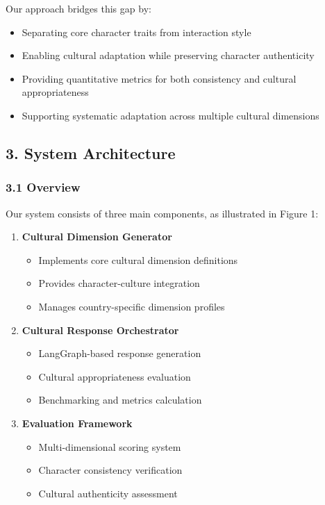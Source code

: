 \documentclass[
]{article}
\providecommand{\tightlist}{%
  \setlength{\itemsep}{0pt}\setlength{\parskip}{0pt}}
\begin{document}
Our approach bridges this gap by: 
\begin{itemize}
  \tightlist
  \item
    Separating core character traits from interaction style
  \item 
    Enabling cultural adaptation while preserving character authenticity
  \item 
    Providing quantitative metrics for both consistency and cultural appropriateness
  \item 
    Supporting systematic adaptation across multiple cultural dimensions
\end{itemize}

\subsection{3. System Architecture}\label{system-architecture}

\subsubsection{3.1 Overview}\label{overview}

Our system consists of three main components, as illustrated in Figure
1:

\begin{enumerate}
\def\labelenumi{\arabic{enumi}.}
\tightlist
\item
  \textbf{Cultural Dimension Generator}

  \begin{itemize}
  \tightlist
  \item
    Implements core cultural dimension definitions
  \item
    Provides character-culture integration
  \item
    Manages country-specific dimension profiles
  \end{itemize}
\item
  \textbf{Cultural Response Orchestrator}

  \begin{itemize}
  \tightlist
  \item
    LangGraph-based response generation
  \item
    Cultural appropriateness evaluation
  \item
    Benchmarking and metrics calculation
  \end{itemize}
\item
  \textbf{Evaluation Framework}

  \begin{itemize}
  \tightlist
  \item
    Multi-dimensional scoring system
  \item
    Character consistency verification
  \item
    Cultural authenticity assessment
  \end{itemize}
\end{enumerate}
\end{document}
